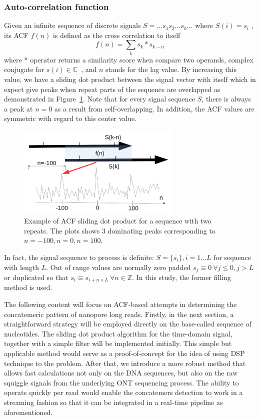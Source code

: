 \subsubsection{Auto-correlation function}
Given an infinite sequence of discrete signals $S=\ldots s_1 s_2 \ldots s_k \ldots$ where $S(i)=s_i$ , its ACF $f(n)$ is defined as the cross correlation to itself
\begin{equation}
 f(n)=\sum_{k}{s_k\ast s_{k-n}}   
 \label{eq:acf}
\end{equation}
where $\ast$ operator returns a similarity score when compare two operands, \EG{} complex conjugate for $s(i) \in \mathbb{C}$~\cite{Rockwood2005crosscorrelation}, and $n$ stands for the lag value. By increasing this value, we have a sliding dot product between the signal vector with itself which in expect give peaks when repeat parts of the sequence are overlapped as demonstrated in Figure~\ref{fig:concat_acf}. Note that for every signal sequence $S$, there is always a peak at $n=0$ as a result from self-overlapping. In addition, the ACF values are symmetric with regard to this center value.
\begin{figure}[ht]
\centerline{\includegraphics[width=0.7\textwidth]{images/acf.png}}
\caption[Example of ACF sliding dot product for a sequence with two repeats]{Example of ACF sliding dot product for a sequence with two repeats. The plots shows 3 dominating peaks corresponding to $n=-100, n=0, n=100$.}
\label{fig:concat_acf}
\end{figure}

In fact, the signal sequence to process is definite: $S=\{s_i\}, i=1 \ldots L$ for sequence with length $L$. Out of range values are normally zero padded $s_j \equiv 0 \: \forall j \leq 0,j > L$ or duplicated so that $s_i \equiv s_{i+n \times L} \: \forall n \in \mathbb{Z}$. In this study, the former filling method is used.

The following content will focus on ACF-based attempts in determining the concatemeric pattern of nanopore long reads.
Firstly, in the next section, a straightforward strategy will be employed  directly on the base-called sequence of nucleotides. The sliding dot product algorithm for the time-domain signal, together with a simple filter will be implemented initially. 
This simple but applicable method would serve as a proof-of-concept for the idea of using DSP technique to the problem.
After that, we introduce a more robust method that allows fast calculations not only on the DNA sequences, but also on the raw squiggle signals from the underlying ONT sequencing process. 
The ability to operate quickly per read would enable the concatemers detection to work in a streaming fashion so that it can be integrated in a real-time pipeline as aforementioned.

